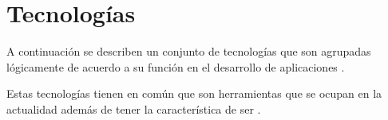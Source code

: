 
\section{Tecnologías }\label{cap:estadoArte:tecnologias}
A continuación se describen un conjunto de tecnologías que son agrupadas lógicamente de acuerdo a su función en el desarrollo de aplicaciones \webINT.

Estas tecnologías tienen en común que son herramientas que se ocupan en la actualidad además de tener la característica de ser \openSourcePC. 

\subsection{\dataBasesDB}

